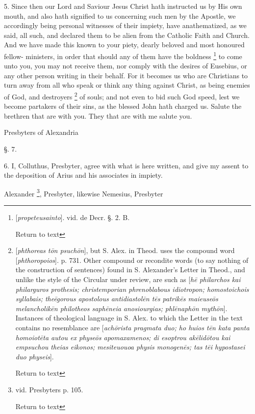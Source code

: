 5. Since then our Lord and Saviour Jesus Christ
hath instructed us by His own mouth, and also hath signified to us
concerning such men by the Apostle, we accordingly being personal
witnesses of their impiety, have anathematized, as we said, all such,
and declared them to be alien from the Catholic Faith and Church. And
we have made this known to your piety, dearly beloved and most
honoured fellow- ministers, in order that should any of them have the
boldness \footnote{[\emph{propeteusainto}]. vid. de Decr. §. 2. B.

Return to text} to come unto you, you may not receive them, nor comply with the desires of
Eusebius, or any other person writing in their behalf. For it becomes
us who are Christians to turn away from all who speak or think any
thing against Christ, as being enemies of God, and destroyers \footnote{[\emph{phthoreas t\={o}n psuch\={o}n}], but S. Alex. in Theod.
uses the compound word [\emph{phthoropoios}]. p. 731. Other compound
or recondite words (to say nothing of the construction of sentences)
found in S. Alexander's Letter in Theod., and unlike the style of the
Circular under review, are such as [\emph{h\={e} philarchos kai
philarguros prothesis; christemporian phrenoblabous idiotropon;
homostoichois syllabais; the\={e}gorous apostolous antidiastol\={e}n
t\={e}s patrik\={e}s maieuse\={o}s melancholik\={e}n
philotheos saph\={e}neia anosiourgias; phl\={e}naph\={o}n
myth\={o}n}]. Instances of theological language in S. Alex. to
which the Letter in the text contains no resemblance are [\emph{ach\={o}rista
pragmata duo; ho huios t\={e}n kata panta homoiot\={e}ta autou
ex physe\={o}s apomaxamenos; di esoptrou ak\={e}lid\={o}tou
kai empsuchou theias eikonos; mesiteuouoa physis monogen\={e}s; tas
t\={e}i hypostasei duo physeis}].

Return to text

} of souls; and not even to bid such God speed, lest we become
partakers of their sins, as the blessed John hath charged us. Salute
the brethren that are with you. They that are with me salute you.

Presbyters of Alexandria

§. 7.

6. I, Colluthus, Presbyter, agree with what is
here written, and give my assent to the deposition of Arius and his
associates in impiety.

Alexander \footnote{vid.
Presbyters p. 105.

Return to text},
Presbyter, likewise
Nemesius, Presbyter


